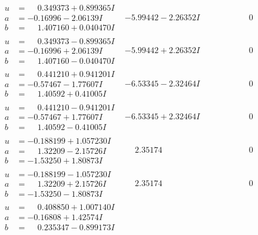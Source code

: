 \documentclass[1p]{elsarticle_modified}
\theoremstyle{definition}
\begin{document}
$$\begin{array}{c|c|c}
\begin{aligned}
u &= \phantom{-}0.349373 + 0.899365 I \\
a &= -0.16996 - 2.06139 I \\
b &= \phantom{-}1.407160 + 0.040470 I\end{aligned}
 & -5.99442 - 2.26352 I & \phantom{-0.000000 } 0 \\ \hline\begin{aligned}
u &= \phantom{-}0.349373 - 0.899365 I \\
a &= -0.16996 + 2.06139 I \\
b &= \phantom{-}1.407160 - 0.040470 I\end{aligned}
 & -5.99442 + 2.26352 I & \phantom{-0.000000 } 0 \\ \hline\begin{aligned}
u &= \phantom{-}0.441210 + 0.941201 I \\
a &= -0.57467 - 1.77607 I \\
b &= \phantom{-}1.40592 + 0.41005 I\end{aligned}
 & -6.53345 - 2.32464 I & \phantom{-0.000000 } 0 \\ \hline\begin{aligned}
u &= \phantom{-}0.441210 - 0.941201 I \\
a &= -0.57467 + 1.77607 I \\
b &= \phantom{-}1.40592 - 0.41005 I\end{aligned}
 & -6.53345 + 2.32464 I & \phantom{-0.000000 } 0 \\ \hline\begin{aligned}
u &= -0.188199 + 1.057230 I \\
a &= \phantom{-}1.32209 - 2.15726 I \\
b &= -1.53250 + 1.80873 I\end{aligned}
 & \phantom{-}2.35174\phantom{ +0.000000I} & \phantom{-0.000000 } 0 \\ \hline\begin{aligned}
u &= -0.188199 - 1.057230 I \\
a &= \phantom{-}1.32209 + 2.15726 I \\
b &= -1.53250 - 1.80873 I\end{aligned}
 & \phantom{-}2.35174\phantom{ +0.000000I} & \phantom{-0.000000 } 0 \\ \hline\begin{aligned}
u &= \phantom{-}0.408850 + 1.007140 I \\
a &= -0.16808 + 1.42574 I \\
b &= \phantom{-}0.235347 - 0.899173 I\end{aligned}

\end{array}$$
\end{document}
